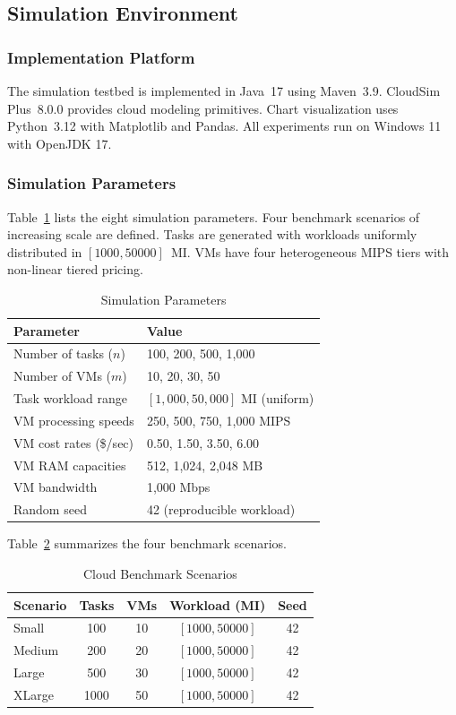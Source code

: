 \documentclass[conference]{IEEEtran}
\begin{document}
\subsection{Simulation Environment}

\subsubsection{Implementation Platform}
The simulation testbed is implemented in Java~17 using Maven~3.9.
CloudSim Plus~8.0.0 provides cloud modeling primitives.
Chart visualization uses Python~3.12 with Matplotlib and Pandas.
All experiments run on Windows 11 with OpenJDK 17.

\subsubsection{Simulation Parameters}
Table~\ref{tab:sim_params} lists the eight simulation parameters.
Four benchmark scenarios of increasing scale are defined.
Tasks are generated with workloads uniformly distributed in $[1000, 50000]$~MI.
VMs have four heterogeneous MIPS tiers with non-linear tiered pricing.

\begin{table}[!t]
\centering
\caption{Simulation Parameters}
\label{tab:sim_params}
\begin{tabular}{lp{4.8cm}}
\toprule
\textbf{Parameter} & \textbf{Value} \\
\midrule
Number of tasks ($n$) & 100, 200, 500, 1{,}000 \\
Number of VMs ($m$) & 10, 20, 30, 50 \\
Task workload range & $[1{,}000, 50{,}000]$ MI (uniform) \\
VM processing speeds & 250, 500, 750, 1{,}000 MIPS \\
VM cost rates (\$/sec) & 0.50, 1.50, 3.50, 6.00 \\
VM RAM capacities & 512, 1{,}024, 2{,}048 MB \\
VM bandwidth & 1{,}000 Mbps \\
Random seed & 42 (reproducible workload) \\
\bottomrule
\end{tabular}
\end{table}

Table~\ref{tab:scenarios} summarizes the four benchmark scenarios.

\begin{table}[!t]
\centering
\caption{Cloud Benchmark Scenarios}
\label{tab:scenarios}
\begin{tabular}{lcccc}
\toprule
\textbf{Scenario} & \textbf{Tasks} & \textbf{VMs} & \textbf{Workload (MI)} & \textbf{Seed} \\
\midrule
Small   & 100  & 10 & $[1000, 50000]$ & 42 \\
Medium  & 200  & 20 & $[1000, 50000]$ & 42 \\
Large   & 500  & 30 & $[1000, 50000]$ & 42 \\
XLarge  & 1000 & 50 & $[1000, 50000]$ & 42 \\
\bottomrule
\end{tabular}
\end{table}
\end{document}
